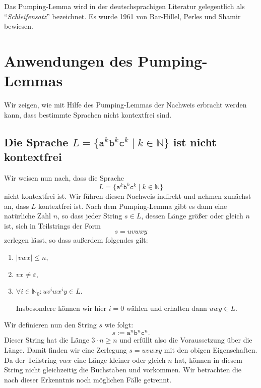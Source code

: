 \remark
Das Pumping-Lemma wird in der deutschsprachigen Literatur gelegentlich  als 
``\emph{Schleifensatz}'' bezeichnet.   Es wurde 1961 von Bar-Hillel, Perles und Shamir
\cite{barhillel:1961} bewiesen.

\section{Anwendungen des Pumping-Lemmas}
Wir zeigen, wie mit Hilfe des Pumping-Lemmas der Nachweis erbracht werden kann, dass
bestimmte Sprachen nicht kontextfrei sind.

\subsection{Die Sprache $L = \{ \mathtt{a}^k \mathtt{b}^k \mathtt{c}^k \mid k \in \mathbb{N} \}$ ist
nicht kontextfrei}
Wir weisen nun nach, dass die Sprache
\[ L = \{ \mathtt{a}^k \mathtt{b}^k \mathtt{c}^k \mid k \in \mathbb{N} \} \]
nicht kontextfrei ist.  Wir f\"uhren diesen Nachweis indirekt und nehmen zun\"achst an, dass $L$
kontextfrei ist.  Nach dem Pumping-Lemma gibt es dann eine nat\"urliche Zahl $n$, so dass jeder String
$s \in L$, dessen L\"ange gr\"o{\ss}er oder gleich $n$ ist, sich in Teilstrings der Form
\[ s = uvwxy \]
zerlegen l\"asst, so dass au{\ss}erdem folgendes gilt:
\begin{enumerate}
\item $|vwx| \leq n$,
\item $vx \not= \varepsilon$,
\item $\forall i \in \mathbb{N}_0: uv^iwx^iy \in L$.

      Insbesondere k\"onnen wir hier $i=0$ w\"ahlen und erhalten dann
      $uwy \in L$. 
\end{enumerate}
Wir definieren nun den String $s$ wie folgt:
\[ s := \mathtt{a}^n\mathtt{b}^n\mathtt{c}^n. \]
Dieser String hat die L\"ange $3 \cdot n \geq n$ und erf\"ullt also die Voraussetzung \"uber die L\"ange.
Damit finden wir eine Zerlegung $s=uvwxy$ mit den obigen Eigenschaften.  Da der Teilstring
$vwx$ eine L\"ange kleiner oder gleich $n$ hat, k\"onnen in diesem String nicht gleichzeitig die
Buchstaben  und  vorkommen. Wir betrachten die nach dieser Erkenntnis noch
m\"oglichen  F\"alle getrennt.
